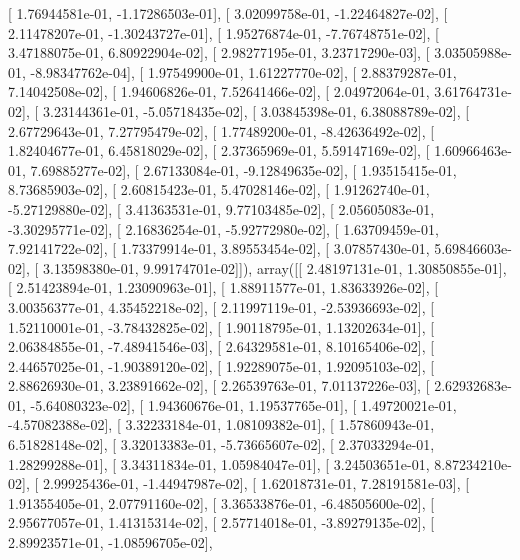 \documentclass{article}
\begin{document}
       [  1.76944581e-01,  -1.17286503e-01],
       [  3.02099758e-01,  -1.22464827e-02],
       [  2.11478207e-01,  -1.30243727e-01],
       [  1.95276874e-01,  -7.76748751e-02],
       [  3.47188075e-01,   6.80922904e-02],
       [  2.98277195e-01,   3.23717290e-03],
       [  3.03505988e-01,  -8.98347762e-04],
       [  1.97549900e-01,   1.61227770e-02],
       [  2.88379287e-01,   7.14042508e-02],
       [  1.94606826e-01,   7.52641466e-02],
       [  2.04972064e-01,   3.61764731e-02],
       [  3.23144361e-01,  -5.05718435e-02],
       [  3.03845398e-01,   6.38088789e-02],
       [  2.67729643e-01,   7.27795479e-02],
       [  1.77489200e-01,  -8.42636492e-02],
       [  1.82404677e-01,   6.45818029e-02],
       [  2.37365969e-01,   5.59147169e-02],
       [  1.60966463e-01,   7.69885277e-02],
       [  2.67133084e-01,  -9.12849635e-02],
       [  1.93515415e-01,   8.73685903e-02],
       [  2.60815423e-01,   5.47028146e-02],
       [  1.91262740e-01,  -5.27129880e-02],
       [  3.41363531e-01,   9.77103485e-02],
       [  2.05605083e-01,  -3.30295771e-02],
       [  2.16836254e-01,  -5.92772980e-02],
       [  1.63709459e-01,   7.92141722e-02],
       [  1.73379914e-01,   3.89553454e-02],
       [  3.07857430e-01,   5.69846603e-02],
       [  3.13598380e-01,   9.99174701e-02]]), array([[  2.48197131e-01,   1.30850855e-01],
       [  2.51423894e-01,   1.23090963e-01],
       [  1.88911577e-01,   1.83633926e-02],
       [  3.00356377e-01,   4.35452218e-02],
       [  2.11997119e-01,  -2.53936693e-02],
       [  1.52110001e-01,  -3.78432825e-02],
       [  1.90118795e-01,   1.13202634e-01],
       [  2.06384855e-01,  -7.48941546e-03],
       [  2.64329581e-01,   8.10165406e-02],
       [  2.44657025e-01,  -1.90389120e-02],
       [  1.92289075e-01,   1.92095103e-02],
       [  2.88626930e-01,   3.23891662e-02],
       [  2.26539763e-01,   7.01137226e-03],
       [  2.62932683e-01,  -5.64080323e-02],
       [  1.94360676e-01,   1.19537765e-01],
       [  1.49720021e-01,  -4.57082388e-02],
       [  3.32233184e-01,   1.08109382e-01],
       [  1.57860943e-01,   6.51828148e-02],
       [  3.32013383e-01,  -5.73665607e-02],
       [  2.37033294e-01,   1.28299288e-01],
       [  3.34311834e-01,   1.05984047e-01],
       [  3.24503651e-01,   8.87234210e-02],
       [  2.99925436e-01,  -1.44947987e-02],
       [  1.62018731e-01,   7.28191581e-03],
       [  1.91355405e-01,   2.07791160e-02],
       [  3.36533876e-01,  -6.48505600e-02],
       [  2.95677057e-01,   1.41315314e-02],
       [  2.57714018e-01,  -3.89279135e-02],
       [  2.89923571e-01,  -1.08596705e-02],
\end{document}
